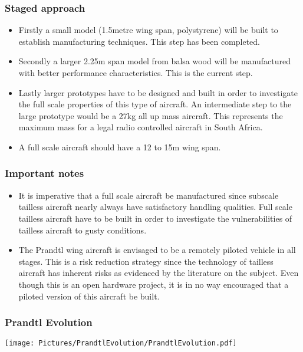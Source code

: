 \documentclass{beamer}
\begin{document}
\begin{frame}
\frametitle{Staged approach}

\begin{itemize}
\item Firstly a small model (1.5metre wing span, polystyrene) will be built to establish manufacturing techniques.  This step has been completed.
\item Secondly a larger 2.25m span model from balsa wood will be manufactured with better performance characteristics.  This is the current step.
\item Lastly larger prototypes have to be designed and built in order to investigate the full scale properties of this type of aircraft.  An intermediate step to the large prototype would be a 27kg all up mass aircraft.  This represents the maximum mass for a legal radio controlled aircraft in South Africa.
\item A full scale aircraft should have a 12 to 15m wing span.  
\end{itemize}

\end{frame}


\begin{frame}
\frametitle{Important notes}

\begin{itemize}
\item It is imperative that a full scale aircraft 
be manufactured since subscale tailless aircraft nearly always have satisfactory handling qualities.  Full scale tailless aircraft 
have to be built in order to investigate the vulnerabilities of tailless aircraft to gusty conditions.
\item The Prandtl wing aircraft is envisaged to be a remotely piloted vehicle in all stages.  This is a risk reduction strategy since the technology of tailless aircraft has inherent risks as evidenced by the literature on the subject.  Even though this is an open hardware project, it is in no way encouraged that a piloted version of this aircraft be built.
\end{itemize}

\end{frame}


\begin{frame}
\frametitle{Prandtl Evolution}

\texttt{[image: Pictures/PrandtlEvolution/PrandtlEvolution.pdf]}

\end{frame}
\end{document}
